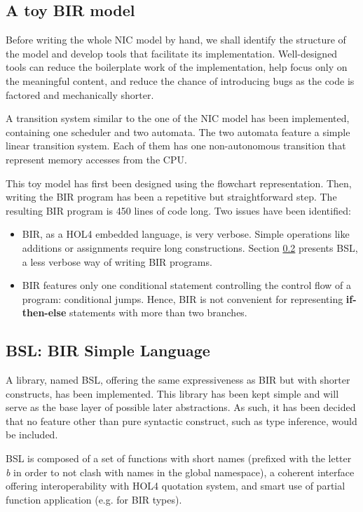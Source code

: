 \documentclass[10pt,a4paper]{article}
\begin{document}
\begin{multicols}{2}
\subsection{A toy BIR model} \label{alice-bob-toy}

Before writing the whole NIC model by hand, we shall identify the structure of the model and develop tools that facilitate its implementation. Well-designed tools can reduce the boilerplate work of the implementation, help focus only on the meaningful content, and reduce the chance of introducing bugs as the code is factored and mechanically shorter.

A transition system similar to the one of the NIC model has been implemented, containing one scheduler and two automata. The two automata feature a simple linear transition system. Each of them has one non-autonomous transition that represent memory accesses from the CPU.

This toy model has first been designed using the flowchart representation. Then, writing the BIR program has been a repetitive but straightforward step. The resulting BIR program is \num{450} lines of code long. Two issues have been identified:

\begin{itemize}
    \item BIR, as a HOL4 embedded language, is very verbose. Simple operations like additions or assignments require long constructions. Section \ref{bsl} presents BSL, a less verbose way of writing BIR programs.
    \item BIR features only one conditional statement controlling the control flow of a program: conditional jumps. Hence, BIR is not convenient for representing \textbf{if-then-else} statements with more than two branches.
\end{itemize}

\subsection{BSL: BIR Simple Language} \label{bsl}

A library, named BSL, offering the same expressiveness as BIR but with shorter constructs, has been implemented. This library has been kept simple and will serve as the base layer of possible later abstractions. As such, it has been decided that no feature other than pure syntactic construct, such as type inference, would be included.

BSL is composed of a set of functions with short names (prefixed with the letter \textit{b} in order to not clash with names in the global namespace), a coherent interface offering interoperability with HOL4 quotation system, and smart use of partial function application (e.g. for BIR types).


\end{multicols}
\end{document}
